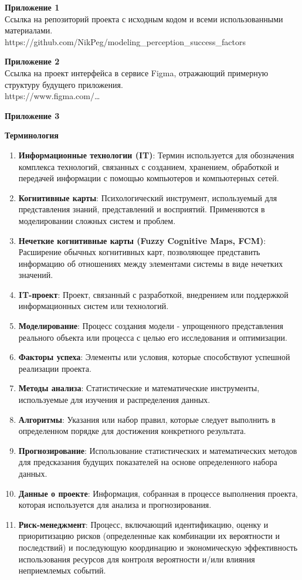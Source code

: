 \documentclass{article}
\newcommand\zz[1]{\par{\normalsize\strut #1} \hfill\ignorespaces}
\begin{document}
    \zz{}\textbf{Приложение 1\\}
    Ссылка на репозиторий проекта с исходным кодом и всеми использованными материалами.\\
    https://github.com/NikPeg/modeling\_perception\_success\_factors\\
    \zz{}\textbf{Приложение 2\\}
    Ссылка на проект интерфейса в сервисе Figma, отражающий примерную структуру будущего приложения.\\
    https://www.figma.com/\ldots\\
    \zz{}\textbf{Приложение 3\\}
    \zz{}\textbf{Терминология\\}
    \begin{enumerate}
        \item \textbf{Информационные технологии (IT)}: Термин используется для обозначения комплекса технологий, связанных с созданием, хранением, обработкой и передачей информации с помощью компьютеров и компьютерных сетей.
        \item \textbf{Когнитивные карты}: Психологический инструмент, используемый для представления знаний, представлений и восприятий. Применяются в моделировании сложных систем и проблем.
        \item \textbf{Нечеткие когнитивные карты (Fuzzy Cognitive Maps, FCM)}: Расширение обычных когнитивных карт, позволяющее представить информацию об отношениях между элементами системы в виде нечетких значений.
        \item \textbf{IT-проект}: Проект, связанный с разработкой, внедрением или поддержкой информационных систем или технологий.
        \item \textbf{Моделирование}: Процесс создания модели - упрощенного представления реального объекта или процесса с целью его исследования и оптимизации.
        \item \textbf{Факторы успеха}: Элементы или условия, которые способствуют успешной реализации проекта.
        \item \textbf{Методы анализа}: Статистические и математические инструменты, используемые для изучения и распределения данных.
        \item \textbf{Алгоритмы}: Указания или набор правил, которые следует выполнить в определенном порядке для достижения конкретного результата.
        \item \textbf{Прогнозирование}: Использование статистических и математических методов для предсказания будущих показателей на основе определенного набора данных.
        \item \textbf{Данные о проекте}: Информация, собранная в процессе выполнения проекта, которая используется для анализа и прогнозирования.
        \item \textbf{Риск-менеджмент}: Процесс, включающий идентификацию, оценку и приоритизацию рисков (определенные как комбинации их вероятности и последствий) и последующую координацию и экономическую эффективность использования ресурсов для контроля вероятности и/или влияния неприемлемых событий.
    \end{enumerate}
\end{document}
